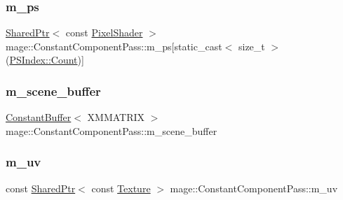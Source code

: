 \subsubsection{\texorpdfstring{m\+\_\+ps}{m\_ps}}
{\footnotesize\ttfamily \hyperlink{namespacemage_a1e01ae66713838a7a67d30e44c67703e}{Shared\+Ptr}$<$ const \hyperlink{namespacemage_ac98506b7edd999ea43ec46fbd0330238}{Pixel\+Shader} $>$ mage\+::\+Constant\+Component\+Pass\+::m\+\_\+ps\mbox{[}static\+\_\+cast$<$ size\+\_\+t $>$(\hyperlink{classmage_1_1_constant_component_pass_a5700234587f2aa0ebdb4f7790704f00bae93f994f01c537c4e2f7d8528c3eb5e9}{P\+S\+Index\+::\+Count})\mbox{]}\hspace{0.3cm}{\ttfamily [private]}}

\hypertarget{classmage_1_1_constant_component_pass_a21e24e6ae1ed28f9c0bd339b68119574}{}\label{classmage_1_1_constant_component_pass_a21e24e6ae1ed28f9c0bd339b68119574} 
\subsubsection{\texorpdfstring{m\+\_\+scene\+\_\+buffer}{m\_scene\_buffer}}
{\footnotesize\ttfamily \hyperlink{structmage_1_1_constant_buffer}{Constant\+Buffer}$<$ X\+M\+M\+A\+T\+R\+IX $>$ mage\+::\+Constant\+Component\+Pass\+::m\+\_\+scene\+\_\+buffer\hspace{0.3cm}{\ttfamily [private]}}

\hypertarget{classmage_1_1_constant_component_pass_ad69f0d02de95b9125651b447cd8fd884}{}\label{classmage_1_1_constant_component_pass_ad69f0d02de95b9125651b447cd8fd884} 
\subsubsection{\texorpdfstring{m\+\_\+uv}{m\_uv}}
{\footnotesize\ttfamily const \hyperlink{namespacemage_a1e01ae66713838a7a67d30e44c67703e}{Shared\+Ptr}$<$ const \hyperlink{classmage_1_1_texture}{Texture} $>$ mage\+::\+Constant\+Component\+Pass\+::m\+\_\+uv\hspace{0.3cm}{\ttfamily [private]}}

